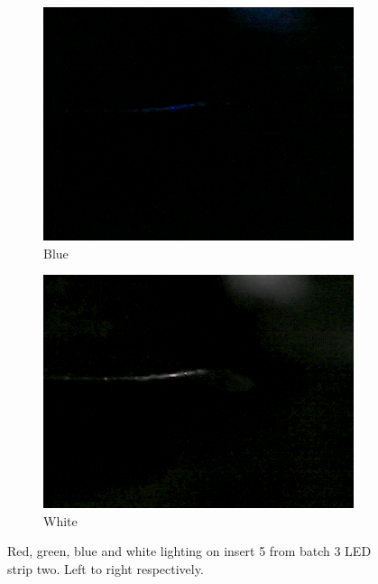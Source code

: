 \begin{figure}
			\hspace*{\fill}
			\begin{subfigure}{0.24\textwidth}
				\includegraphics[width=\linewidth, keepaspectratio=true]{./fig/Vision/Dataset/automated_datasets/2_created_datasets/1_Birthday_dataset/b_003_p_005_b_l_006_blue_B.png}
				\caption{Blue}
			\end{subfigure}
			\hspace*{\fill}
			\begin{subfigure}{0.24\textwidth}
				\includegraphics[width=\linewidth, keepaspectratio=true]{./fig/Vision/Dataset/automated_datasets/2_created_datasets/1_Birthday_dataset/b_003_p_005_b_l_006_white_B.png}
				\caption{White}
			\end{subfigure}
			\caption{Red, green, blue and white lighting on insert 5 from batch 3 LED strip two. Left to right respectively.}
			\label{fig:impl:dataset:birthday:strip2}

		\end{figure}


